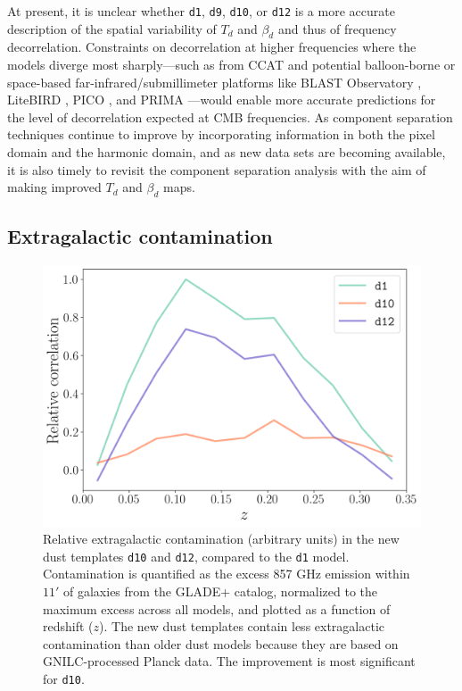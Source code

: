 \documentclass[twocolumn]{aastex631}
\begin{document}
At present, it is unclear whether \texttt{d1}, \texttt{d9}, \texttt{d10}, or \texttt{d12} is a more accurate description of the spatial variability of $T_d$ and $\beta_d$ and thus of frequency decorrelation. Constraints on decorrelation at higher frequencies where the models diverge most sharply---such as from CCAT \citep{CCAT-PrimeCollaboration:2023} and potential balloon-borne or space-based far-infrared/submillimeter platforms like BLAST Observatory \citep{Coppi:2024}, LiteBIRD \citep{LiteBIRDCollaboration:2023}, PICO \citep{Hanany:2019}, and PRIMA \citep{Dowell:2024}---would enable more accurate predictions for the level of decorrelation expected at CMB frequencies. As component separation techniques continue to improve by incorporating information in both the pixel domain and the harmonic domain, and as new data sets are becoming available, it is also timely to revisit the component separation analysis with the aim of making improved $T_d$ and $\beta_d$ maps.

\subsection{Extragalactic contamination} \label{sec:CIBcontamination}

\begin{figure}[ht!]
    \centering
    \includegraphics[width=\columnwidth]{figures/dust_galaxy_correlation.png}
    \caption{Relative extragalactic contamination (arbitrary units) in the new dust templates \texttt{d10} and \texttt{d12}, compared to the \texttt{d1} model. Contamination is quantified as the excess 857 GHz emission within $11'$ of galaxies from the GLADE+ catalog, normalized to the maximum excess across all models, and plotted as a function of redshift ($z$). The new dust templates contain less extragalactic contamination than older dust models because they are based on GNILC-processed Planck data. The improvement is most significant for \texttt{d10}.}
    \label{fig:extragal_contamination}
\end{figure}
\end{document}
